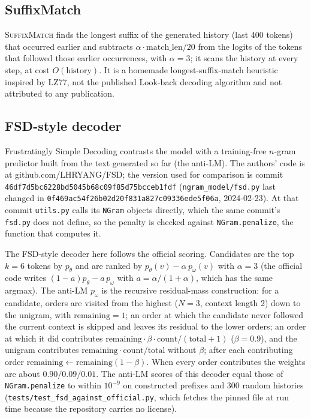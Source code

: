 \subsection{SuffixMatch}
\textsc{SuffixMatch} finds the longest suffix of the generated history (last 400 tokens) that occurred earlier and subtracts $\alpha\cdot\text{match\_len}/20$ from the logits of the tokens that followed those earlier occurrences, with $\alpha{=}3$; it scans the history at every step, at cost $O(\text{history})$. It is a homemade longest-suffix-match heuristic inspired by LZ77, not the published Look-back decoding algorithm and not attributed to any publication.

\subsection{FSD-style decoder}
\label{app:fsd}
Frustratingly Simple Decoding \citep{yang2023frustratingly} contrasts the model with a training-free $n$-gram predictor built from the text generated so far (the anti-LM). The authors' code is at github.com/LHRYANG/FSD; the version used for comparison is commit \texttt{46df7d5bc622\allowbreak{}8bd5045b68c0\allowbreak{}9f85d75bcceb\allowbreak{}1fdf} (\texttt{ngram\_model/fsd.py} last changed in \texttt{0f469ac54f26\allowbreak{}b02d20f831a8\allowbreak{}27c09336ede5\allowbreak{}f06a}, 2024-02-23). At that commit \texttt{utils.py} calls its \texttt{NGram} objects directly, which the same commit's \texttt{fsd.py} does not define, so the penalty is checked against \texttt{NGram.penalize}, the function that computes it.

The FSD-style decoder here follows the official scoring. Candidates are the top $k{=}6$ tokens by $p_\theta$ and are ranked by $p_\theta(v)-\alpha\,p_\omega(v)$ with $\alpha{=}3$ (the official code writes $(1{-}a)p_\theta-a\,p_\omega$ with $a=\alpha/(1{+}\alpha)$, which has the same argmax). The anti-LM $p_\omega$ is the recursive residual-mass construction: for a candidate, orders are visited from the highest ($N{=}3$, context length 2) down to the unigram, with $\text{remaining}=1$; an order at which the candidate never followed the current context is skipped and leaves its residual to the lower orders; an order at which it did contributes $\text{remaining}\cdot\beta\cdot\text{count}/(\text{total}{+}1)$ ($\beta{=}0.9$), and the unigram contributes $\text{remaining}\cdot\text{count}/\text{total}$ without $\beta$; after each contributing order $\text{remaining}\leftarrow\text{remaining}(1-\beta)$. When every order contributes the weights are about $0.90/0.09/0.01$. The anti-LM scores of this decoder equal those of \texttt{NGram.penalize} to within $10^{-9}$ on constructed prefixes and 300 random histories (\texttt{tests/test\_\allowbreak{}fsd\_\allowbreak{}against\_\allowbreak{}official.py}, which fetches the pinned file at run time because the repository carries no license).

